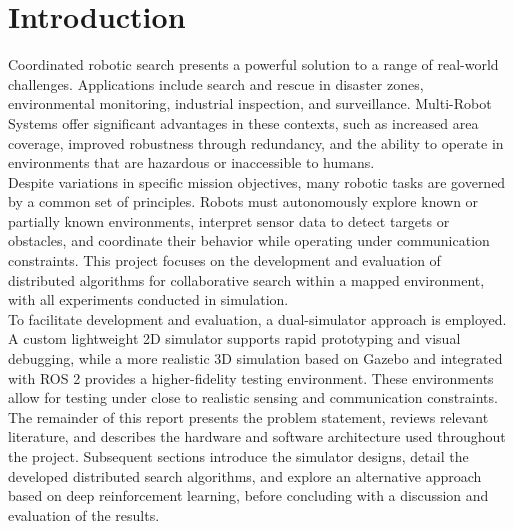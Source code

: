 \section{Introduction}
\label{sec:Introduction}
Coordinated robotic search presents a powerful solution to a range of real-world challenges.
Applications include search and rescue in disaster zones, environmental monitoring, industrial inspection, and surveillance. 
Multi-Robot Systems offer significant advantages in these contexts, such as increased area coverage, improved robustness through redundancy, and the ability to operate in environments that are hazardous or inaccessible to humans.\\

Despite variations in specific mission objectives, many robotic tasks are governed by a common set of principles. 
Robots must autonomously explore known or partially known environments, interpret sensor data to detect targets or obstacles, and coordinate their behavior while operating under communication constraints. 
This project focuses on the development and evaluation of distributed algorithms for collaborative search within a mapped environment, with all experiments conducted in simulation.\\

To facilitate development and evaluation, a dual-simulator approach is employed. 
A custom lightweight 2D simulator supports rapid prototyping and visual debugging, while a more realistic 3D simulation based on Gazebo and integrated with ROS 2 provides a higher-fidelity testing environment. 
These environments allow for testing under close to realistic sensing and communication constraints.\\

The remainder of this report presents the problem statement, reviews relevant literature, and describes the hardware and software architecture used throughout the project. 
Subsequent sections introduce the simulator designs, detail the developed distributed search algorithms, and explore an alternative approach based on deep reinforcement learning, before concluding with a discussion and evaluation of the results.
